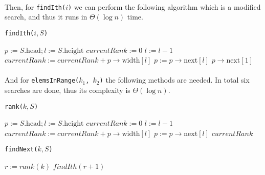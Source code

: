 \documentclass[../main.tex]{subfiles}
\begin{document}
\paragraph{} Then, for \texttt{findIth(\(i\))} we can perform the following algorithm which is a modified search, and thus it runs in \(\Theta(\log n)\) time.

\begin{algorithm}[H]
\caption{\texttt{findIth(\(i, S\))}}
\label{alg:ex2.findIth}
\begin{algorithmic}
  \State \(p := S.\text{head}; l := S.\text{height}\)
  \State \(currentRank := 0\)
      \State \(l := l - 1\)
    \Else
      \State \(currentRank := currentRank + p \rightarrow \text{width}[l]\)
      \State \(p := p \rightarrow \text{next}[l]\)
    \EndIf
  \EndWhile
  \State \Return \(p \rightarrow \text{next}[1]\)
\end{algorithmic}
\end{algorithm}

\paragraph{} And for \texttt{elemsInRange(\(k_{1}\), \(k_{2}\))} the following methods are needed. In total six searches are done, thus its complexity is \(\Theta(\log n)\).

\begin{algorithm}[H]
\caption{\texttt{rank(\(k, S\))}}
\label{alg:ex2.rank}
\begin{algorithmic}
  \State \(p := S.\text{head}; l := S.\text{height}\)
  \State \(currentRank := 0\)
      \State \(l := l - 1\)
    \Else
      \State \(currentRank := currentRank + p \rightarrow \text{width}[l]\)
      \State \(p := p \rightarrow \text{next}[l]\)
    \EndIf
  \EndWhile
  \State \Return \(currentRank\)
\end{algorithmic}
\end{algorithm}

\begin{algorithm}[H]
\caption{\texttt{findNext(\(k, S\))}}
\label{alg:ex2.findNext}
\begin{algorithmic}
  \State \(r := rank(k)\)
  \State \Return \(findIth(r+1)\)
\end{algorithmic}
\end{algorithm}
\end{document}
